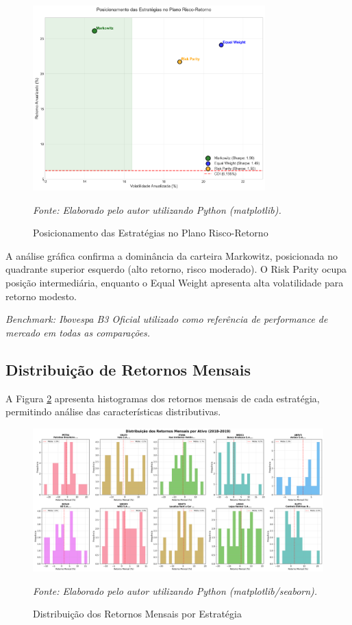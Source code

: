 \begin{figure}[H]
\centering
\includegraphics[width=0.8\textwidth]{images/risk_return_plot.png}
\caption{Posicionamento das Estratégias no Plano Risco-Retorno}
\textit{Fonte: Elaborado pelo autor utilizando Python (matplotlib).}
\label{fig:risk_return}
\end{figure}

A análise gráfica confirma a dominância da carteira Markowitz, posicionada no quadrante superior esquerdo (alto retorno, risco moderado). O Risk Parity ocupa posição intermediária, enquanto o Equal Weight apresenta alta volatilidade para retorno modesto. 

\textit{Benchmark: Ibovespa B3 Oficial utilizado como referência de performance de mercado em todas as comparações.}

\subsection{Distribuição de Retornos Mensais}

A Figura \ref{fig:returns_distribution} apresenta histogramas dos retornos mensais de cada estratégia, permitindo análise das características distributivas.

\begin{figure}[H]
\centering
\includegraphics[width=\textwidth]{images/returns_distribution.png}
\caption{Distribuição dos Retornos Mensais por Estratégia}
\textit{Fonte: Elaborado pelo autor utilizando Python (matplotlib/seaborn).}
\label{fig:returns_distribution}
\end{figure}

